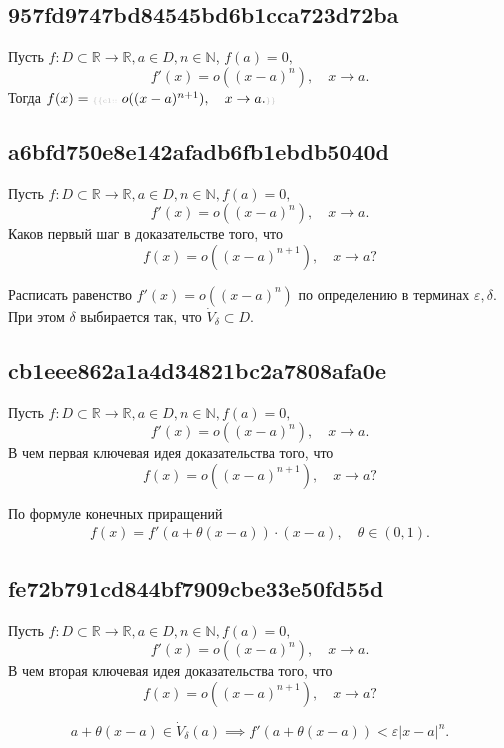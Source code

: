 \documentclass[11pt, a5paper]{article}
\newenvironment{note}[1]{\goodbreak\par\subsection{\hfill \color{lightgray}\tiny #1}}{}
\newenvironment{cloze}[2][\ldots]{\begin{leftbar}}{\end{leftbar}}
\newenvironment{icloze}[2][\ldots]{%
  \ignorespaces\text{\tiny \color{lightgray} \{\{c#2:: }%
}{%
  \text{\tiny \color{lightgray}\}\}}\unskip%
}
\begin{document}
\begin{note}{957fd9747bd84545bd6b1cca723d72ba}
    Пусть \( f : D \subset \mathbb R \to \mathbb R, a \in D, n \in \mathbb N \), \begin{icloze}{2}\(f(a) = 0, \)
    \[
        f'(x) = o((x - a)^{n} ), \quad x \to a.
    \]\end{icloze}
    Тогда \( f(x) = \begin{icloze}{1}o((x - a)^{n + 1}), \quad x \to a.\end{icloze} \)
\end{note}

\begin{note}{a6bfd750e8e142afadb6fb1ebdb5040d}
    Пусть \( f : D \subset \mathbb R \to \mathbb R, a \in D, n \in \mathbb N, f(a) = 0, \)
    \[
        f'(x) = o((x - a)^{n} ), \quad x \to a.
    \]
    Каков первый шаг в доказательстве того, что
    \[
        f(x) = o((x - a)^{n + 1}), \quad x \to a?
    \]

    \begin{cloze}{1}
        Расписать равенство \( f'(x) = o((x - a)^{n} ) \) по определению в терминах \( \varepsilon, \delta. \)
        При этом \( \delta \) выбирается так, что \( \dot V_{\delta} \subset D. \)
    \end{cloze}
\end{note}

\begin{note}{cb1eee862a1a4d34821bc2a7808afa0e}
    Пусть \( f : D \subset \mathbb R \to \mathbb R, a \in D, n \in \mathbb N, f(a) = 0, \)
    \[
        f'(x) = o((x - a)^{n} ), \quad x \to a.
    \]
    В чем первая ключевая идея доказательства того, что
    \[
        f(x) = o((x - a)^{n + 1}), \quad x \to a?
    \]

    \begin{cloze}{1}
        По формуле конечных приращений
        \[
            \begin{gathered}
                f(x) = f'(a + \theta(x - a)) \cdot (x - a), \quad \theta \in (0, 1).
            \end{gathered}
        \]
    \end{cloze}
\end{note}

\begin{note}{fe72b791cd844bf7909cbe33e50fd55d}
    Пусть \( f : D \subset \mathbb R \to \mathbb R, a \in D, n \in \mathbb N, f(a) = 0, \)
    \[
        f'(x) = o((x - a)^{n} ), \quad x \to a.
    \]
    В чем вторая ключевая идея доказательства того, что
    \[
        f(x) = o((x - a)^{n + 1}), \quad x \to a?
    \]

    \begin{cloze}{1}
        \[
            a + \theta(x - a) \in \dot V_{\delta} (a) \implies f'(a + \theta(x - a)) < \varepsilon|x - a|^{n}.
        \]
    \end{cloze}
\end{note}
\end{document}
